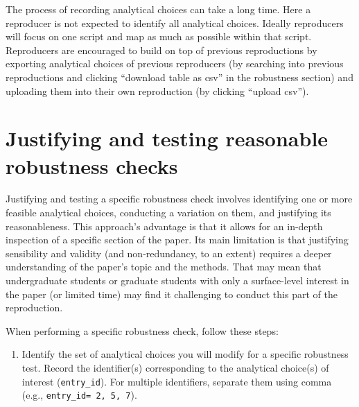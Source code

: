 \documentclass[
  openany]{book}
\providecommand{\tightlist}{%
  \setlength{\itemsep}{0pt}\setlength{\parskip}{0pt}}
\begin{document}
The process of recording analytical choices can take a long time. Here a reproducer is not expected to identify all analytical choices. Ideally reproducers will focus on one script and map as much as possible within that script. Reproducers are encouraged to build on top of previous reproductions by exporting analytical choices of previous reproducers (by searching into previous reproductions and clicking ``download table as csv'' in the robustness section) and uploading them into their own reproduction (by clicking ``upload csv'').

\hypertarget{justifying-and-testing-reasonable-robustness-checks}{%
\section{Justifying and testing reasonable robustness checks}\label{justifying-and-testing-reasonable-robustness-checks}}

Justifying and testing a specific robustness check involves identifying one or more feasible analytical choices, conducting a variation on them, and justifying its reasonableness. This approach's advantage is that it allows for an in-depth inspection of a specific section of the paper. Its main limitation is that justifying sensibility and validity (and non-redundancy, to an extent) requires a deeper understanding of the paper's topic and the methods. That may mean that undergraduate students or graduate students with only a surface-level interest in the paper (or limited time) may find it challenging to conduct this part of the reproduction.

When performing a specific robustness check, follow these steps:

\begin{enumerate}
\def\labelenumi{\arabic{enumi}.}
\tightlist
\item
  Identify the set of analytical choices you will modify for a specific robustness test. Record the identifier(s) corresponding to the analytical choice(s) of interest (\texttt{entry\_id}). For multiple identifiers, separate them using comma (e.g., \texttt{entry\_id=\ 2,\ 5,\ 7}).
\end{enumerate}
\end{document}
